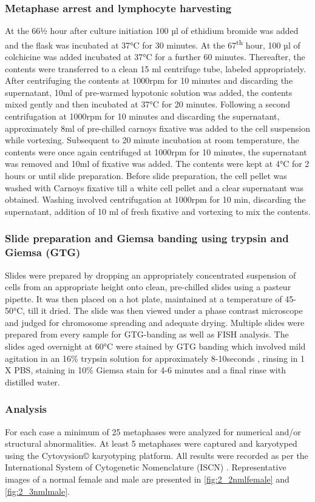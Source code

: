 \begin{refsection}
\subsubsection{Metaphase arrest and lymphocyte harvesting}
At the 66½ hour after culture initiation 100 µl of ethidium bromide was added and the flask was incubated at 37°C for 30 minutes. At the 67\textsuperscript{th} hour, 100 µl of colchicine was added incubated at 37°C for a further 60 minutes. Thereafter, the contents were transferred to a clean 15 ml centrifuge tube, labeled appropriately. After centrifuging the contents at 1000rpm for 10 minutes and discarding the supernatant, 10ml of pre-warmed hypotonic solution was added, the contents mixed gently and then incubated at 37°C for 20 minutes. Following a second centrifugation at 1000rpm for 10 minutes and discarding the supernatant, approximately 8ml of pre-chilled carnoys fixative was added to the cell suspension while vortexing. Subsequent to 20 minute incubation at room temperature, the contents were once again centrifuged at 1000rpm for 10 minutes, the supernatant was removed and 10ml of fixative was added. The contents were kept at 4°C for 2 hours or until slide preparation. Before slide preparation, the cell pellet was washed with Carnoys fixative till a white cell pellet and a clear supernatant was obtained. Washing involved centrifugation at 1000rpm for 10 min, discarding the supernatant, addition of 10 ml of fresh fixative and vortexing to mix the contents.
\subsubsection{Slide preparation and Giemsa banding using trypsin and Giemsa (GTG)}
Slides were prepared by dropping an appropriately concentrated suspension of cells from an appropriate height onto clean, pre-chilled slides using a pasteur pipette. It was then placed on a hot plate, maintained at a temperature of 45-50°C, till it dried. The slide was then viewed under a phase contrast microscope and judged for chromosome spreading and adequate drying. Multiple slides were prepared from every sample for GTG-banding as well as FISH analysis. The slides aged overnight at 60°C were stained by GTG banding which involved mild agitation in an 16\%  trypsin solution for  approximately 8-10seconds , rinsing in 1 X PBS, staining in 10\% Giemsa stain for 4-6 minutes and a final rinse with distilled water. 
\subsubsection{Analysis}
For each case a minimum of 25 metaphases were analyzed for numerical and/or structural abnormalities. At least 5 metaphases were captured and karyotyped using the Cytovysion© karyotyping platform. All results were recorded as per the International System of Cytogenetic Nomenclature (ISCN) \cite{shaffer2013iscn}. Representative images of a normal female and male are presented in \cref{fig:2_2nmlfemale} and \cref{fig:2_3nmlmale}.


\end{refsection}
